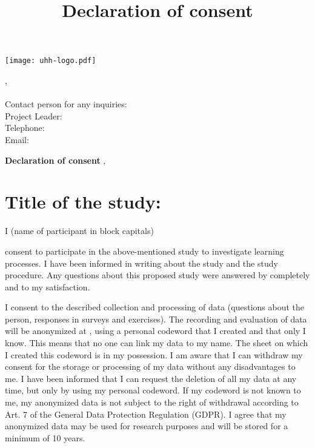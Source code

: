\documentclass[11pt,twoside,a4paper]{article}
\title{\vspace{-1.5cm}\Large Declaration of consent
\vspace{-1.7cm}}
\begin{document}
\thispagestyle{fancy}

\begin{minipage}{0.5\linewidth}
    \texttt{[image: uhh-logo.pdf]}
\end{minipage}
\begin{minipage}{0.5\textwidth}\raggedleft{}
    \ApplicantUniversity{}, \ApplicantInstitute{}\\
    \ApplicantResearchGroup{}\\
    Contact person for any inquiries:\\
    Project Leader: \ProjectLeaderName{}\\
    Telephone: \InvestigatorPhoneNumber{}\\
    Email: \InvestigatorEmailAddress{}
\end{minipage}
\vspace*{1em}

\begin{flushleft}
    \Large{\textbf{Declaration of consent}}\newline{}
    \ApplicantUniversity{}, \ApplicantInstitute{}
\end{flushleft}

\section{Title of the study: \ProjectTitle{}}

I (name of participant in block capitals) \hrulefill{}

consent to participate in the above-mentioned study to investigate learning processes.
I have been informed in writing about the study and the study procedure.
Any questions about this proposed study were answered by \InvestigatorName{} completely and to my satisfaction.

I consent to the described collection and processing of data (questions about the person, responses in surveys and exercises).
The recording and evaluation of data will be anonymized at \ApplicantUniversity{}, using a personal codeword that I created and that only I know.
This means that no one can link my data to my name.
The sheet on which I created this codeword is in my possession.
I am aware that I can withdraw my consent for the storage or processing of my data without any disadvantages to me.
I have been informed that I can request the deletion of all my data at any time, but only by using my personal codeword.
If my codeword is not known to me, my anonymized data is not subject to the right of withdrawal according to Art. 7 of the General Data Protection Regulation (GDPR).
I agree that my anonymized data may be used for research purposes and will be stored for a minimum of 10 years.
\end{document}
